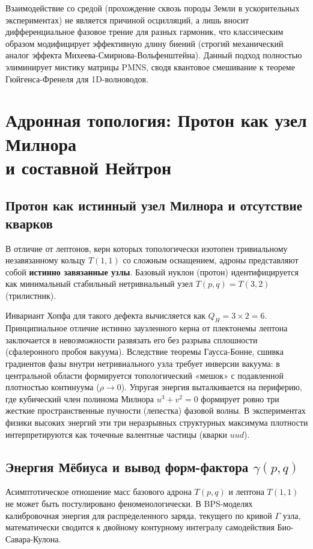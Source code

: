 \documentclass[11pt,a4paper]{article}
\begin{document}
	Взаимодействие со средой (прохождение сквозь породы Земли в ускорительных экспериментах) не является причиной осцилляций, а лишь вносит дифференциальное фазовое трение для разных гармоник, что классическим образом модифицирует эффективную длину биений (строгий механический аналог эффекта Михеева-Смирнова-Вольфенштейна). Данный подход полностью элиминирует мистику матрицы PMNS, сводя квантовое смешивание к теореме Гюйгенса-Френеля для 1D-волноводов.
	
	\section{Адронная топология: Протон как узел Милнора\\ и составной Нейтрон}
	
	\subsection{Протон как истинный узел Милнора и отсутствие кварков}
	В отличие от лептонов, керн которых топологически изотопен тривиальному незавязанному кольцу $T(1,1)$ со сложным оснащением, адроны представляют собой \textbf{истинно завязанные узлы}. 
	Базовый нуклон (протон) идентифицируется как минимальный стабильный нетривиальный узел $T(p,q) = T(3,2)$ (трилистник).
	
	Инвариант Хопфа для такого дефекта вычисляется как $Q_H = 3 \times 2 = 6$. 
	Принципиальное отличие истинно заузленного керна от плектонемы лептона заключается в невозможности развязать его без разрыва сплошности (сфалеронного пробоя вакуума). Вследствие теоремы Гаусса-Бонне, сшивка градиентов фазы внутри нетривиального узла требует инверсии вакуума: в центральной области формируется топологический «мешок» с подавленной плотностью континуума ($\rho \to 0$).
	Упругая энергия выталкивается на периферию, где кубический член полинома Милнора $u^3+v^2=0$ формирует ровно три жесткие пространственные пучности (лепестка) фазовой волны. В экспериментах физики высоких энергий эти три неразрывных структурных максимума плотности интерпретируются как точечные валентные частицы (кварки $uud$).
	
\subsection{Энергия Мёбиуса и вывод форм-фактора $\gamma(p,q)$}
Асимптотическое отношение масс базового адрона $T(p,q)$ и лептона $T(1,1)$ не может быть постулировано феноменологически. В BPS-моделях калибровочная энергия для распределенного заряда, текущего по кривой $\Gamma$ узла, математически сводится к двойному контурному интегралу самодействия Био-Савара-Кулона.
\end{document}

